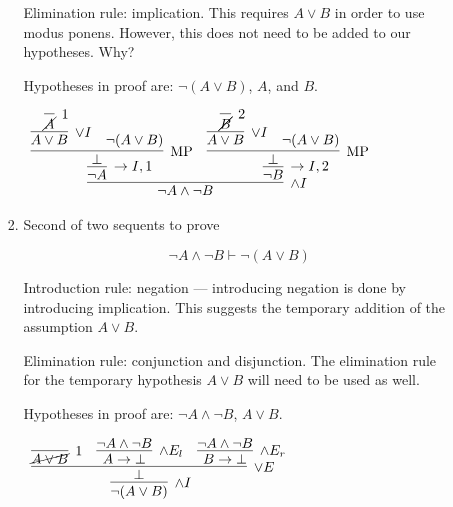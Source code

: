 \documentclass[11pt]{report}
\begin{document}
\begin{enumerate}
\begin{enumerate}
\begin{enumerate}
			\vspace{0.2cm}
			
			Elimination rule: implication. This requires $A \lor B$ in order to use modus ponens. However, this does not need to be added to our hypotheses. Why?
		
			\vspace{0.2cm}

			Hypotheses in proof are: $\lnot(A \lor B)$, $A$, and $B$.

			\vspace{0.2cm}
			\begin{mdframed}
				\begin{center}
					$\begin{array}{c}
						\infer[\land I]{\lnot A \land \lnot B}
							{\infer[\to I,1]{\lnot A}
								{\infer[\MP]{\bot}
									{\infer[\lor I]{A \lor B}{\infer[1]{\cancel{A}}{}}
									&
									\lnot(A \lor B)}}
							&
							\infer[\to I,2]{\lnot B}
							{\infer[\MP]{\bot}
								{\infer[\lor I]{A \lor B}{\infer[2]{\cancel{B}}{}}
									&
									\lnot(A \lor B)}}}
					\end{array}$
				\end{center}
			\end{mdframed}

			\item Second of two sequents to prove
			
			$$\lnot A \land \lnot B \vdash \lnot(A \lor B)$$	
			
			Introduction rule: negation --- introducing negation is done by introducing implication. This suggests the temporary addition of the assumption $A \lor B$. 
			
			\vspace{0.2cm}
			
			Elimination rule: conjunction and disjunction. The elimination rule for the temporary hypothesis $A \lor B$ will need to be used as well. 
		
			\vspace{0.2cm}

			Hypotheses in proof are: $\lnot A \land \lnot B$, $A \lor B$. 

			\vspace{0.2cm}
			
			\begin{mdframed}
				\begin{center}
					$\begin{array}{c}
						\infer[\land I]{\lnot(A \lor B)}
							{\infer[\lor E]{\bot}
								{\infer[1]{\cancel{A \lor B}}{}
								& 
								\infer[\land E_{l}]{A \to \bot}{\lnot A \land \lnot B}
								&
								\infer[\land E_{r}]{B \to \bot}{\lnot A \land \lnot B}}}
					\end{array}$
				\end{center}
			\end{mdframed}
			\end{enumerate}
				

\end{enumerate}
\end{enumerate}
\end{document}
